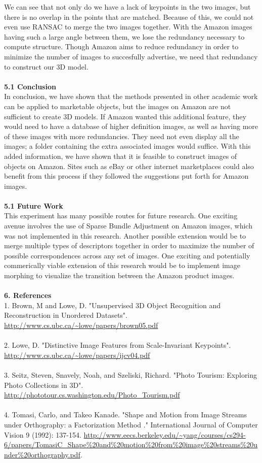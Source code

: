 \documentclass[12pt]{article}
\begin{document}
\begin{multicols}{2}
We can see that not only do we have a lack of keypoints in the two images, but there is no overlap in the points that are matched. Because of this, we could not even use RANSAC to merge the two images together. With the Amazon images having such a large angle between them, we lose the redundancy necessary to compute structure. Though Amazon aims to reduce redundancy in order to minimize the number of images to succesfully advertise, we need that redundancy to construct our 3D model.\\\\
{\large \textbf{5.1 Conclusion}}\\
In conclusion, we have shown that the methods presented in other academic work can be applied to marketable objects, but the images on Amazon are not sufficient to create 3D models. If Amazon wanted this additional feature, they would need to have a database of higher definition images, as well as having more of these images with more redundancies. They need not even display all the images; a folder containing the extra associated images would suffice. With this added information, we have shown that it is feasible to construct images of objects on Amazon. Sites such as eBay or other internet marketplaces could also benefit from this process if they followed the suggestions put forth for Amazon images. \\\\
{\large \textbf{5.1 Future Work}}\\
This experiment has many possible routes for future research. One exciting avenue involves the use of Sparse Bundle Adjustment on Amazon images, which was not implemented in this research. Another possible extension would be to merge multiple types of descriptors together in order to maximize the number of possible correspondences across any set of images. One exciting and potentially commerically viable extension of this research would be to implement image morphing to visualize the transition between the Amazon product images. \\\\
{\large \textbf{6. References}}\\
1. Brown, M and Lowe, D. "Unsupervised 3D Object Recognition and Reconstruction in Unordered Datasets". \url{http://www.cs.ubc.ca/~lowe/papers/brown05.pdf}\\\\
2. Lowe, D. "Distinctive Image Features from Scale-Invariant Keypoints". \url{http://www.cs.ubc.ca/~lowe/papers/ijcv04.pdf} \\\\
3. Seitz, Steven, Snavely, Noah, and Szeliski, Richard. "Photo Tourism: Exploring Photo Collections in 3D". \url{http://phototour.cs.washington.edu/Photo_Tourism.pdf} \\\\
4. Tomasi, Carlo, and Takeo Kanade. "Shape and Motion from Image Streams under Orthography: a Factorization Method ." International Journal of Computer Vision 9 (1992): 137-154. \url{http://www.eecs.berkeley.edu/~yang/courses/cs294-6/papers/TomasiC_Shape\%20and\%20motion\%20from\%20image\%20streams\%20under\%20orthography.pdf}. \\

\end{multicols}
\end{document}

